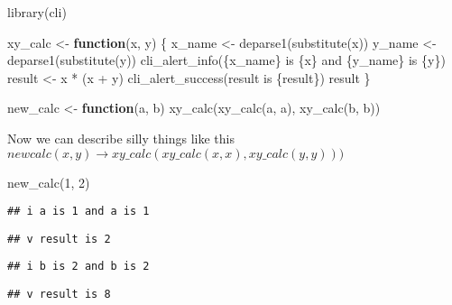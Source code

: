 \documentclass[
]{book}
\newenvironment{Shaded}{\begin{snugshade}}{\end{snugshade}}
\newcommand{\ControlFlowTok}[1]{\textcolor[rgb]{0.13,0.29,0.53}{\textbf{#1}}}
\newcommand{\DecValTok}[1]{\textcolor[rgb]{0.00,0.00,0.81}{#1}}
\newcommand{\FunctionTok}[1]{\textcolor[rgb]{0.00,0.00,0.00}{#1}}
\newcommand{\NormalTok}[1]{#1}
\newcommand{\OtherTok}[1]{\textcolor[rgb]{0.56,0.35,0.01}{#1}}
\newcommand{\SpecialCharTok}[1]{\textcolor[rgb]{0.00,0.00,0.00}{#1}}
\newcommand{\StringTok}[1]{\textcolor[rgb]{0.31,0.60,0.02}{#1}}
\begin{document}
\begin{Shaded}
\begin{Highlighting}[]
\FunctionTok{library}\NormalTok{(cli)}

\NormalTok{xy\_calc }\OtherTok{\textless{}{-}} \ControlFlowTok{function}\NormalTok{(x, y) \{}
\NormalTok{  x\_name }\OtherTok{\textless{}{-}} \FunctionTok{deparse1}\NormalTok{(}\FunctionTok{substitute}\NormalTok{(x))}
\NormalTok{  y\_name }\OtherTok{\textless{}{-}} \FunctionTok{deparse1}\NormalTok{(}\FunctionTok{substitute}\NormalTok{(y))}
  \FunctionTok{cli\_alert\_info}\NormalTok{(}\StringTok{\textquotesingle{}\{x\_name\} is \{x\} and \{y\_name\} is \{y\}\textquotesingle{}}\NormalTok{)}
\NormalTok{  result }\OtherTok{\textless{}{-}}\NormalTok{ x }\SpecialCharTok{*}\NormalTok{ (x }\SpecialCharTok{+}\NormalTok{ y)}
  \FunctionTok{cli\_alert\_success}\NormalTok{(}\StringTok{\textquotesingle{}result is \{result\}\textquotesingle{}}\NormalTok{)}
\NormalTok{  result}
\NormalTok{\}}

\NormalTok{new\_calc }\OtherTok{\textless{}{-}} \ControlFlowTok{function}\NormalTok{(a, b) }\FunctionTok{xy\_calc}\NormalTok{(}\FunctionTok{xy\_calc}\NormalTok{(a, a), }\FunctionTok{xy\_calc}\NormalTok{(b, b))}
\end{Highlighting}
\end{Shaded}

Now we can describe silly things like this \(newcalc(x, y) \rightarrow xy\_calc(xy\_calc(x, x), xy\_calc(y,y)))\)

\begin{Shaded}
\begin{Highlighting}[]
\FunctionTok{new\_calc}\NormalTok{(}\DecValTok{1}\NormalTok{, }\DecValTok{2}\NormalTok{)}
\end{Highlighting}
\end{Shaded}

\begin{verbatim}
## i a is 1 and a is 1
\end{verbatim}

\begin{verbatim}
## v result is 2
\end{verbatim}

\begin{verbatim}
## i b is 2 and b is 2
\end{verbatim}

\begin{verbatim}
## v result is 8
\end{verbatim}
\end{document}
